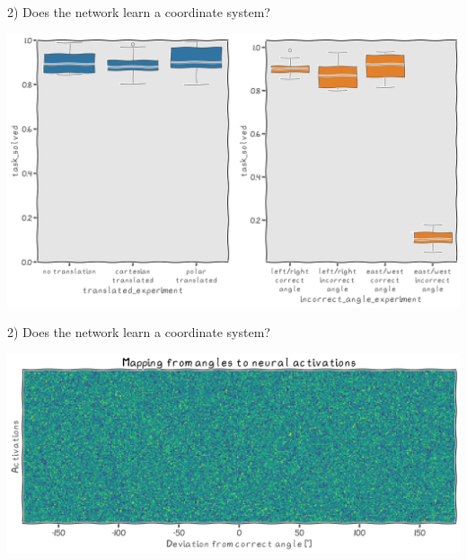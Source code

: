 \documentclass[bigger]{beamer}
\begin{document}
\begin{frame}[label={sec:orgcae1452}]{2) Does the network learn a coordinate system?}
\begin{center}
\includegraphics[width=.9\linewidth]{img/exp2-boxplot.png}
\end{center}
\end{frame}
\begin{frame}[label={sec:orgd4bf8ff}]{2) Does the network learn a coordinate system?}
\begin{center}
\includegraphics[width=.9\linewidth]{img/angles-to-activations.png}
\end{center}
\end{frame}
\end{document}
